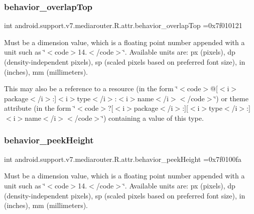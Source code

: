 \subsubsection{\texorpdfstring{behavior\+\_\+overlap\+Top}{behavior\_overlapTop}}
{\footnotesize\ttfamily int android.\+support.\+v7.\+mediarouter.\+R.\+attr.\+behavior\+\_\+overlap\+Top =0x7f010121\hspace{0.3cm}{\ttfamily [static]}}

Must be a dimension value, which is a floating point number appended with a unit such as \char`\"{}$<$code$>$14.\+5sp$<$/code$>$\char`\"{}. Available units are\+: px (pixels), dp (density-\/independent pixels), sp (scaled pixels based on preferred font size), in (inches), mm (millimeters). 

This may also be a reference to a resource (in the form \char`\"{}$<$code$>$@\mbox{[}$<$i$>$package$<$/i$>$\+:\mbox{]}$<$i$>$type$<$/i$>$\+:$<$i$>$name$<$/i$>$$<$/code$>$\char`\"{}) or theme attribute (in the form \char`\"{}$<$code$>$?\mbox{[}$<$i$>$package$<$/i$>$\+:\mbox{]}\mbox{[}$<$i$>$type$<$/i$>$\+:\mbox{]}$<$i$>$name$<$/i$>$$<$/code$>$\char`\"{}) containing a value of this type. \mbox{\label{classandroid_1_1support_1_1v7_1_1mediarouter_1_1R_1_1attr_a22ea1cdcd26bdaebdc3307110a925768}} 
\subsubsection{\texorpdfstring{behavior\+\_\+peek\+Height}{behavior\_peekHeight}}
{\footnotesize\ttfamily int android.\+support.\+v7.\+mediarouter.\+R.\+attr.\+behavior\+\_\+peek\+Height =0x7f0100fa\hspace{0.3cm}{\ttfamily [static]}}

Must be a dimension value, which is a floating point number appended with a unit such as \char`\"{}$<$code$>$14.\+5sp$<$/code$>$\char`\"{}. Available units are\+: px (pixels), dp (density-\/independent pixels), sp (scaled pixels based on preferred font size), in (inches), mm (millimeters). 

